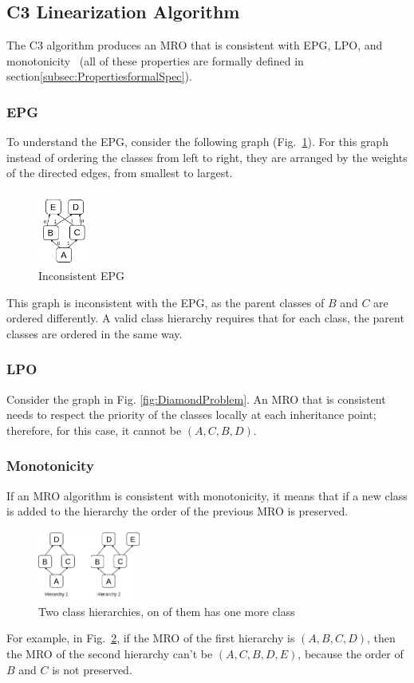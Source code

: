 \documentclass[runningheads]{llncs}
\begin{document}
\subsection{C3 Linearization Algorithm}
\label{subsec:C3Linearization}
The C3 algorithm produces an MRO that is consistent with EPG, LPO, and monotonicity~\autocite{barrettMonotonicSuperclassLinearization1996} (all of these properties are formally defined in section\ref{subsec:PropertiesformalSpec}).

\subsubsection{EPG}
To understand the EPG, consider the following graph (Fig.~\ref{fig:C3Diagram}). For this graph instead of ordering the classes from left to right,
 they are arranged by the weights of the directed edges, from smallest to largest.

\begin{figure}[htbp]
  \centering
  \includegraphics[width=0.15\textwidth]{images/NoneEPG.png}
  \caption{Inconsistent EPG}
  \label{fig:C3Diagram}
\end{figure}

This graph is inconsistent with the EPG, as the parent classes of $B$ and $C$ are ordered differently. A valid class hierarchy requires that for each class, the parent classes are ordered in the same way.
\subsubsection{LPO}
Consider the graph in Fig. \ref{fig:DiamondProblem}. An MRO that is consistent needs to respect the priority of the classes locally at each inheritance point; therefore, for this case, it cannot be $(A, C, B, D)$.
\subsubsection{Monotonicity}
If an MRO algorithm is consistent with monotonicity, it means that if a new class is added to the hierarchy the order of the previous MRO is preserved.
\begin{figure}[htbp]
  \centering
  \includegraphics[width=0.3\textwidth]{images/hierarchyMonotonicity.png}
  \caption{Two class hierarchies, on of them has one more class}
  \label{fig:TwoClassHierarchies}
\end{figure}
For example, in Fig.~\ref{fig:TwoClassHierarchies}, if the MRO of the first hierarchy is $(A, B, C, D)$, 
then the MRO of the second hierarchy can't be $(A, C, B, D, E)$, because the order of $B$ and $C$ is not preserved.
\end{document}

